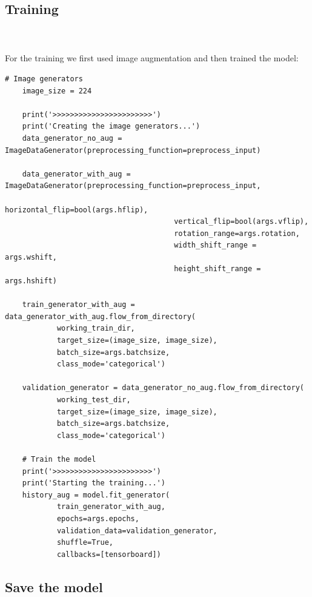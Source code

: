 \documentclass[
	12pt, %
]{fphw}
\begin{document}
\subsection*{Training}
\ \\  \ \\
For the training we first used image augmentation and then trained the model:
\begin{lstlisting}    
# Image generators
    image_size = 224

    print('>>>>>>>>>>>>>>>>>>>>>>>')    
    print('Creating the image generators...')
    data_generator_no_aug = ImageDataGenerator(preprocessing_function=preprocess_input)

    data_generator_with_aug = ImageDataGenerator(preprocessing_function=preprocess_input,
                                       horizontal_flip=bool(args.hflip),
                                       vertical_flip=bool(args.vflip),
                                       rotation_range=args.rotation,
                                       width_shift_range = args.wshift,
                                       height_shift_range = args.hshift)

    train_generator_with_aug = data_generator_with_aug.flow_from_directory(
            working_train_dir,
            target_size=(image_size, image_size),
            batch_size=args.batchsize,
            class_mode='categorical')

    validation_generator = data_generator_no_aug.flow_from_directory(
            working_test_dir,
            target_size=(image_size, image_size),
            batch_size=args.batchsize,
            class_mode='categorical')

    # Train the model
    print('>>>>>>>>>>>>>>>>>>>>>>>')
    print('Starting the training...')
    history_aug = model.fit_generator(
            train_generator_with_aug,
            epochs=args.epochs,
            validation_data=validation_generator,
            shuffle=True,
            callbacks=[tensorboard])

\end{lstlisting}
\subsection*{Save the model}
\ \\  
\end{document}
